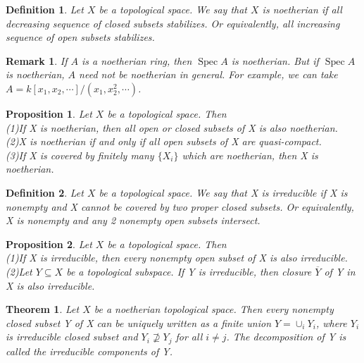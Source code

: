 \documentclass{ctexart}
\newtheorem{definition}{Definition}[section]
\newtheorem{remark}{Remark}[section]
\newtheorem{theorem}{Theorem}[section]
\newtheorem{proposition}{Proposition}[section]
\newcommand{\spec}{\operatorname{Spec}}
\begin{document}
\begin{definition}
    Let $X$ be a topological space.
    We say that $X$ is noetherian if all decreasing sequence of closed subsets stabilizes.
    Or equivalently, all increasing sequence of open subsets stabilizes.
\end{definition}
\begin{remark}
    If $A$ is a noetherian ring, then $\spec A$ is noetherian.
    But if $\spec A$ is noetherian, $A$ need not be noetherian in general.
    For example, we can take $A = k[x_{1}, x_{2}, \cdots]/(x_{1}, x_{2}^{2}, \cdots)$.
    \label{remark:noetherian_affine_scheme_not_noetherian_ring_in_general}
\end{remark}
\begin{proposition}
    Let $X$ be a topological space.
    Then \\
    (1)If X is noetherian, then all open or closed subsets of X is also noetherian. \\
    (2)X is noetherian if and only if all open subsets of X are quasi-compact. \\
    (3)If X is covered by finitely many $\{X_{i}\}$ which are noetherian, then X is noetherian.
    \label{Proposition 3.1}
\end{proposition}
\begin{definition}
    Let $X$ be a topological space.
    We say that X is irreducible if X is nonempty and X cannot be covered by two proper closed subsets.
    Or equivalently, X is nonempty and any 2 nonempty open subsets intersect.
\end{definition}
\begin{proposition}
    Let $X$ be a topological space.
    Then \\
    (1)If X is irreducible, then every nonempty open subset of X is also irreducible. \\
    (2)Let $Y \subseteq X$ be a topological subspace.
    If Y is irreducible, then closure $\overline{Y}$ of Y in X is also irreducible.
    \label{Proposition 3.2}
\end{proposition}
\begin{theorem}
    Let $X$ be a noetherian topological space.
    Then every nonempty closed subset Y of X can be uniquely written as a finite union $Y = \cup_{i} Y_{i}$, where $Y_{i}$ is irreducible closed subset and $Y_{i} \not\supseteq Y_{j}$ for all $i \neq j$.
    The decomposition of Y is called the irreducible components of Y.
    \label{Theorem 3.1}
\end{theorem}
\end{document}
